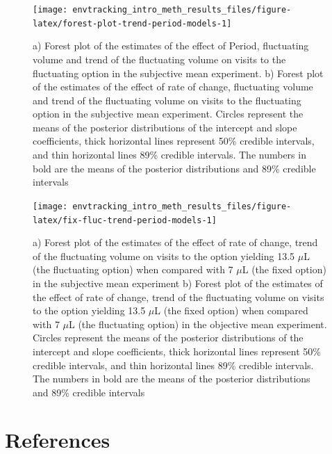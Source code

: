 \documentclass[
]{article}
\begin{document}
\begin{figure}[H]

{\centering \texttt{[image: envtracking\_intro\_meth\_results\_files/figure-latex/forest-plot-trend-period-models-1]} 

}

\caption{a) Forest plot of the estimates of the effect of Period, fluctuating volume and trend of the fluctuating volume on visits to the fluctuating option in the subjective mean experiment. b) Forest plot of the estimates of the effect of rate of change, fluctuating volume and trend of the fluctuating volume on visits to the fluctuating option in the subjective mean experiment. Circles represent the means of the posterior distributions of the intercept and slope coefficients, thick horizontal lines represent 50\% credible intervals, and thin horizontal lines 89\% credible intervals. The numbers in bold are the means of the posterior distributions and 89\% credible intervals}\label{fig:forest-plot-trend-period-models}
\end{figure}



\begin{figure}[H]

{\centering \texttt{[image: envtracking\_intro\_meth\_results\_files/figure-latex/fix-fluc-trend-period-models-1]} 

}

\caption{a) Forest plot of the estimates of the effect of rate of change, trend of the fluctuating volume on visits to the option yielding 13.5 \(\mu\)L (the fluctuating option) when compared with 7 \(\mu\)L (the fixed option) in the subjective mean experiment b) Forest plot of the estimates of the effect of rate of change, trend of the fluctuating volume on visits to the option yielding 13.5 \(\mu\)L (the fixed option) when compared with 7 \(\mu\)L (the fluctuating option) in the objective mean experiment. Circles represent the means of the posterior distributions of the intercept and slope coefficients, thick horizontal lines represent 50\% credible intervals, and thin horizontal lines 89\% credible intervals. The numbers in bold are the means of the posterior distributions and 89\% credible intervals}\label{fig:fix-fluc-trend-period-models}
\end{figure}

\hypertarget{references}{%
\section{References}\label{references}}
\end{document}
